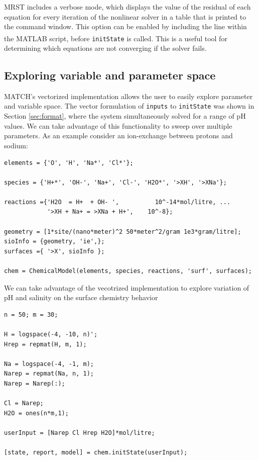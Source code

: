 \documentclass{article}
\begin{document}
MRST includes a verbose mode, which displays the value of the residual of each equation for every iteration of the nonlinear solver in a table that is printed to the command window. This option can be enabled by including the line  within the MATLAB\textsuperscript{\textregistered} script, before \verb|initState| is called. This is a useful tool for determining which equations are not converging if the solver fails. 

\subsection{Exploring variable and parameter space}

MATCH's vectorized implementation allows the user to easily explore parameter and variable space. The vector formulation of \verb|inputs| to \verb|initState| was shown in Section \ref{sec:format}, where the system simultaneously solved for a range of pH values. We can take advantage of this functionality to sweep over multiple parameters. As an example consider an ion-exchange between protons and sodium:

\begin{lstlisting}
elements = {'O', 'H', 'Na*', 'Cl*'};

species = {'H+*', 'OH-', 'Na+', 'Cl-', 'H2O*', '>XH', '>XNa'};

reactions ={'H2O  = H+  + OH- ',          10^-14*mol/litre, ...
            '>XH + Na+ = >XNa + H+',    10^-8};
        
geometry = [1*site/(nano*meter)^2 50*meter^2/gram 1e3*gram/litre];
sioInfo = {geometry, 'ie',};
surfaces ={ '>X', sioInfo };

chem = ChemicalModel(elements, species, reactions, 'surf', surfaces);
\end{lstlisting}
We can take advantage of the vecotrized implementation to explore variation of pH and salinity on the surface chemistry behavior
\begin{lstlisting}
n = 50; m = 30;

H = logspace(-4, -10, n)';
Hrep = repmat(H, m, 1);

Na = logspace(-4, -1, m);
Narep = repmat(Na, n, 1);
Narep = Narep(:);

Cl = Narep;
H2O = ones(n*m,1);

userInput = [Narep Cl Hrep H2O]*mol/litre;

[state, report, model] = chem.initState(userInput);
\end{lstlisting}
\end{document}

